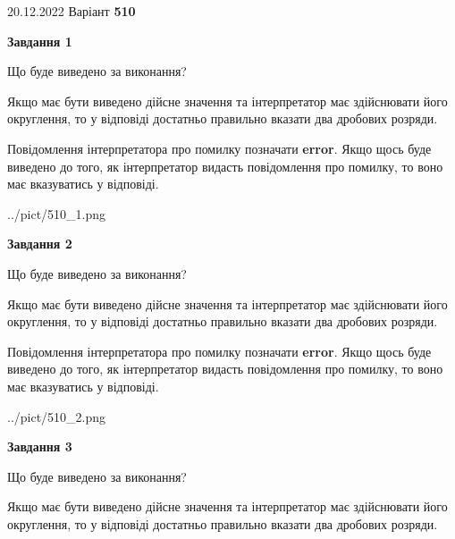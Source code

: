 \documentclass[12pt, ukrainian]{article}
\begin{document}
{20.12.2022 Варіант \No \textbf { 510 }\par}
{
\begin {Large}

{\begin {center}\textbf{Завдання 1}\end {center}}\par
Що буде виведено за виконання? \par

Якщо має бути виведено дійсне значення та інтерпретатор має здійснювати його округлення, 
то у відповіді достатньо правильно вказати два дробових розряди.

Повідомлення інтерпретатора про помилку позначати \textbf{error}.
Якщо щось буде виведено до того, як інтерпретатор видасть повідомлення про помилку, 
то воно має вказуватись у відповіді. \par

\begin{center}
	{../pict/510_1.png}
\end{center}
\newpage

{\begin {center}\textbf{Завдання 2}\end {center}}\par
Що буде виведено за виконання? \par

Якщо має бути виведено дійсне значення та інтерпретатор має здійснювати його округлення, 
то у відповіді достатньо правильно вказати два дробових розряди.

Повідомлення інтерпретатора про помилку позначати \textbf{error}.
Якщо щось буде виведено до того, як інтерпретатор видасть повідомлення про помилку, 
то воно має вказуватись у відповіді. \par

\begin{center}
	{../pict/510_2.png}
\end{center}
\newpage

{\begin {center}\textbf{Завдання 3}\end {center}}\par
Що буде виведено за виконання? \par

Якщо має бути виведено дійсне значення та інтерпретатор має здійснювати його округлення, 
то у відповіді достатньо правильно вказати два дробових розряди.


\end{Large}}
\end{document}
